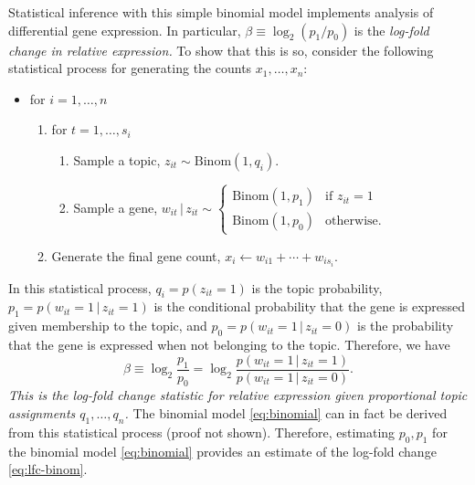 \documentclass[final]{siamart171218}
\begin{document}
Statistical inference with this simple binomial model implements
analysis of differential gene expression. In particular, $\beta \equiv
\log_2(p_1/p_0)$ is the {\em log-fold change in relative expression.}
To show that this is so, consider the following statistical process
for generating the counts $x_1, \ldots, x_n$:
\vspace{1em}
\begin{itemize}

\item for $i = 1, \ldots, n$
\begin{enumerate}

  \item for $t = 1, \ldots, s_i$
  \begin{enumerate}

  \item Sample a topic, $z_{it} \sim \mathrm{Binom}(1,q_i)$.

  \item Sample a gene, $w_{it} \,|\, z_{it} \sim \left\{\begin{array}{ll}
  \mathrm{Binom}(1,p_1) & \mbox{if $z_{it} = 1$} \\
  \mathrm{Binom}(1,p_0) & \mbox{otherwise.}
  \end{array}\right.$

  \end{enumerate}

  \item Generate the final gene count, 
  $x_i \leftarrow w_{i1} + \cdots + w_{is_i}$.

\end{enumerate}
\end{itemize}
\vspace{1em} In this statistical process, $q_i = p(z_{it} = 1)$ is the
topic probability, $p_1 = p(w_{it} = 1 \,|\, z_{it} = 1)$ is the
conditional probability that the gene is expressed given membership to
the topic, and $p_0 = p(w_{it} = 1 \,|\, z_{it} = 0)$ is the
probability that the gene is expressed when not belonging to the
topic. Therefore, we have
\begin{equation}
\beta \equiv \log_2 \frac{p_1}{p_0}  
= \log_2 \frac{p(w_{it} = 1 \,|\, z_{it} = 1)}
            {p(w_{it} = 1 \,|\, z_{it} = 0)}.
\label{eq:lfc-binom}
\end{equation}
{\em This is the log-fold change statistic for relative expression
  given proportional topic assignments $q_1, \ldots, q_n$.} The
binomial model \eqref{eq:binomial} can in fact be derived from this
statistical process (proof not shown). Therefore, estimating $p_0,
p_1$ for the binomial model \eqref{eq:binomial} provides an estimate
of the log-fold change \eqref{eq:lfc-binom}.
\end{document}
